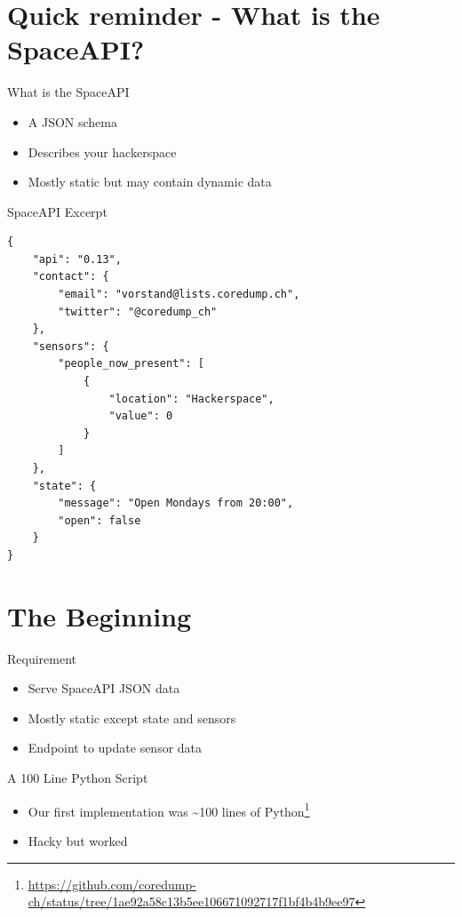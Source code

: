\section{Quick reminder - What is the SpaceAPI?}

\begin{frame}[c]{What is the SpaceAPI}
    \begin{itemize}
        \item A JSON schema
        \item Describes your hackerspace
        \item Mostly static but may contain dynamic data
    \end{itemize}
\end{frame}

\begin{frame}[fragile]{SpaceAPI Excerpt}
    \begin{verbatim}
{
    "api": "0.13",
    "contact": {
        "email": "vorstand@lists.coredump.ch",
        "twitter": "@coredump_ch"
    },
    "sensors": {
        "people_now_present": [
            {
                "location": "Hackerspace",
                "value": 0
            }
        ]
    },
    "state": {
        "message": "Open Mondays from 20:00",
        "open": false
    }
}
    \end{verbatim}
\end{frame}

\section{The Beginning}

\begin{frame}[c]{Requirement}
    \begin{itemize}
        \item Serve SpaceAPI JSON data
        \item Mostly static except state and sensors
        \item Endpoint to update sensor data
    \end{itemize}
\end{frame}

\begin{frame}[c]{A 100 Line Python Script}
    \begin{itemize}
			\item Our first implementation was \~{}100 lines of Python\footnote{\url{https://github.com/coredump-ch/status/tree/1ae92a58c13b5ee106671092717f1bf4b4b9ee97}}
        \item Hacky but worked
    \end{itemize}
\end{frame}

